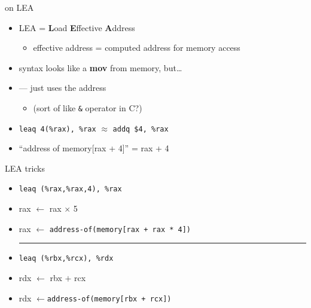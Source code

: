 
\begin{frame}[fragile,label=LEA]{on LEA}
    \begin{itemize}
        \item LEA = \textbf{L}oad \textbf{E}ffective \textbf{A}ddress
        \begin{itemize}
            \item effective address = computed address for memory access
        \end{itemize}
    \item syntax looks like a \textbf{mov} from memory, but\ldots
    \item {} --- just uses the address
        \begin{itemize}
            \item (sort of like {\tt \&} operator in C?)
        \end{itemize}
    \item {}\lstinline|leaq 4(%rax), %rax| $\approx$ \lstinline|addq $4, %rax|
    \item<2-> ``address of memory[rax + 4]'' = rax + 4
    \end{itemize}
\end{frame}

\begin{frame}[fragile,label=LEATricks]{LEA tricks}
    \begin{itemize}
    \item {}\lstinline|leaq (%rax,%rax,4), %rax|
    \item rax $\leftarrow$ rax $\times$ 5
    \item rax $\leftarrow$ {\tt address-of(memory[rax + rax * 4])}
    \vspace{.5cm}
            \hrule
    \vspace{.5cm}
    \item {}\lstinline|leaq (%rbx,%rcx), %rdx|
    \item rdx $\leftarrow$ rbx $+$ rcx
    \item rdx $\leftarrow${\tt address-of(memory[rbx + rcx])}
    \end{itemize}
\end{frame}

